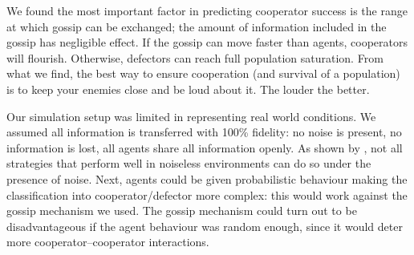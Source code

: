 \documentclass[runningheads]{llncs}
\begin{document}
We found the most important factor in predicting cooperator success is the range at which gossip can be exchanged; the amount of information included in the gossip has negligible effect.
If the gossip can move faster than agents, cooperators will flourish. Otherwise, defectors can reach full population saturation.
From what we find, the best way to ensure cooperation (and survival of a population) is to keep your enemies close and be loud about it.
The louder the better.

Our simulation setup was limited in representing real world conditions.
We assumed all information is transferred with 100\% fidelity: no noise is present, no information is lost, all agents share all information openly.
As shown by \cite{noise}, not all strategies that perform well in noiseless environments can do so under the presence of noise.
Next, agents could be given probabilistic behaviour making the classification into cooperator/defector more complex: this would work against the gossip mechanism we used.
The gossip mechanism could turn out to be disadvantageous if the agent behaviour was random enough, since it would deter more cooperator--cooperator interactions.
%
%
%
%

\end{document}
